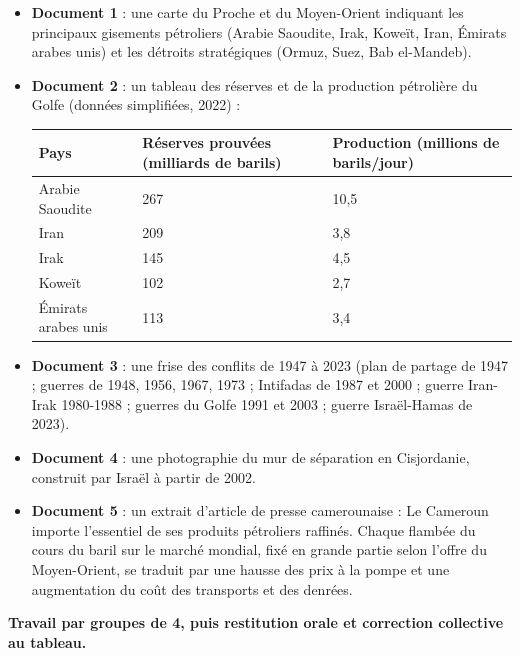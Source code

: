 \documentclass[11pt]{article}
\newcounter{popsec}
\newcounter{popsub}
\newcommand{\courssub}[1]{%
  \stepcounter{popsub}%
  \par\vspace{9pt}\noindent{\popxbold\fontsize{11.5}{13}\selectfont\color{popink}{\color{poporange}\thepopsec.\thepopsub}\hspace{6pt}#1}\par\nopagebreak\vspace{4pt}
}
\begin{document}
\begin{itemize}
\item \textbf{Document 1} : une carte du Proche et du Moyen-Orient indiquant les principaux gisements pétroliers (Arabie Saoudite, Irak, Koweït, Iran, Émirats arabes unis) et les détroits stratégiques (Ormuz, Suez, Bab el-Mandeb).
\item \textbf{Document 2} : un tableau des réserves et de la production pétrolière du Golfe (données simplifiées, 2022) :

\begin{center}
\begin{tabularx}{\linewidth}{|l|X|X|}
\hline
\rowcolor{popblueL} \textbf{Pays} & \textbf{Réserves prouvées (milliards de barils)} & \textbf{Production (millions de barils/jour)} \\
\hline
Arabie Saoudite & 267 & 10,5 \\
\hline
Iran & 209 & 3,8 \\
\hline
Irak & 145 & 4,5 \\
\hline
Koweït & 102 & 2,7 \\
\hline
Émirats arabes unis & 113 & 3,4 \\
\hline
\end{tabularx}
\end{center}

\item \textbf{Document 3} : une frise des conflits de 1947 à 2023 (plan de partage de 1947 ; guerres de 1948, 1956, 1967, 1973 ; Intifadas de 1987 et 2000 ; guerre Iran-Irak 1980-1988 ; guerres du Golfe 1991 et 2003 ; guerre Israël-Hamas de 2023).
\item \textbf{Document 4} : une photographie du mur de séparation en Cisjordanie, construit par Israël à partir de 2002.
\item \textbf{Document 5} : un extrait d'article de presse camerounaise : \og Le Cameroun importe l'essentiel de ses produits pétroliers raffinés. Chaque flambée du cours du baril sur le marché mondial, fixé en grande partie selon l'offre du Moyen-Orient, se traduit par une hausse des prix à la pompe et une augmentation du coût des transports et des denrées. \fg{}
\end{itemize}

\courssub{Consignes}

\textbf{Travail par groupes de 4, puis restitution orale et correction collective au tableau.}
\end{document}
